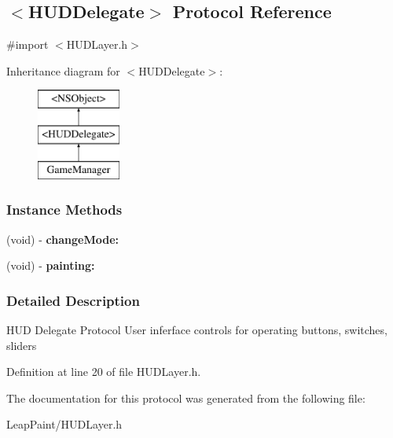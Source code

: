 \hypertarget{protocol_h_u_d_delegate-p}{\subsection{$<$H\-U\-D\-Delegate$>$ Protocol Reference}
\label{d4/db1/protocol_h_u_d_delegate-p}
}


{\ttfamily \#import $<$H\-U\-D\-Layer.\-h$>$}

Inheritance diagram for $<$H\-U\-D\-Delegate$>$\-:\begin{figure}[H]
\begin{center}
\leavevmode
\includegraphics[height=3.000000cm]{d4/db1/protocol_h_u_d_delegate-p}
\end{center}
\end{figure}
\subsubsection*{Instance Methods}
\begin{DoxyCompactItemize}
\item 
\hypertarget{protocol_h_u_d_delegate-p_a9eb11385bd55a3f61fcd752d154bcc81}{(void) -\/ {\bfseries change\-Mode\-:}}\label{d4/db1/protocol_h_u_d_delegate-p_a9eb11385bd55a3f61fcd752d154bcc81}

\item 
\hypertarget{protocol_h_u_d_delegate-p_a2bef4ad83cca602f9c241bbb90f86ab7}{(void) -\/ {\bfseries painting\-:}}\label{d4/db1/protocol_h_u_d_delegate-p_a2bef4ad83cca602f9c241bbb90f86ab7}

\end{DoxyCompactItemize}


\subsubsection{Detailed Description}
H\-U\-D Delegate Protocol User inferface controls for operating buttons, switches, sliders 

Definition at line 20 of file H\-U\-D\-Layer.\-h.



The documentation for this protocol was generated from the following file\-:\begin{DoxyCompactItemize}
\item 
Leap\-Paint/H\-U\-D\-Layer.\-h\end{DoxyCompactItemize}
